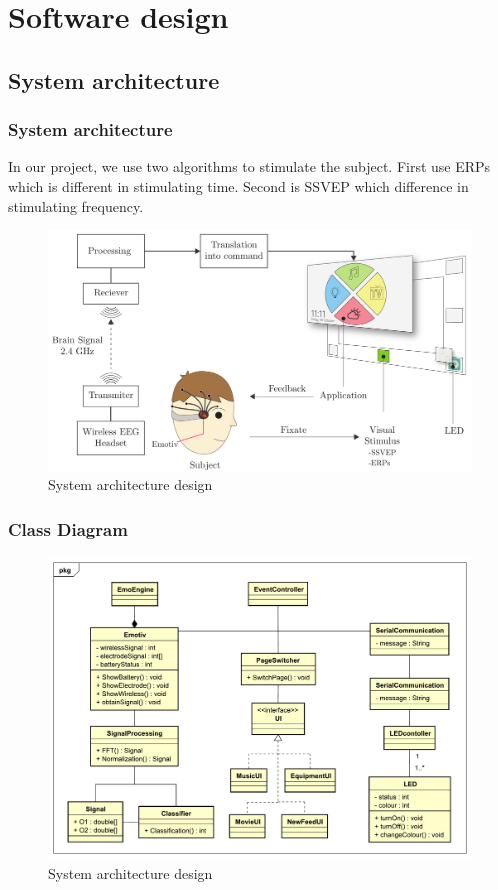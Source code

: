 \chapter{Software design}

\label{ch:Software design}

\setlength{\parindent}{4em}
\setlength{\parskip}{1em}
\renewcommand{\baselinestretch}{1.5}

\section{System architecture}

\subsection{System architecture}
\hspace{1.5cm}In our project, we use two algorithms to stimulate the subject. First use ERPs which is different in stimulating time. Second is SSVEP which difference in stimulating frequency.

\begin{figure}[h]
	\centering
	\includegraphics[scale = 0.3]{chapter5/architec.pdf}
	\caption{System architecture design}
\end{figure}
\subsection{Class Diagram}

\begin{figure}[h]
	\centering
	\includegraphics[scale = 0.3]{chapter5/Class.pdf}
	\caption{System architecture design}
\end{figure}